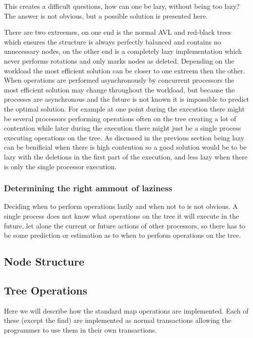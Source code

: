 \documentclass[10pt]{sigplanconf}
\begin{document}
This creates a difficult questions, how can one be lazy, without being too lazy?
The answer is not obvious, but a possible solution is presented here.

There are two extreemes, on one end is the normal AVL and red-black trees which ensures the structure is always perfectly balanced and contains no unnecessary nodes, on the other end is a completely
lazy implementation which never performs rotations and only marks nodes as deleted.
Depending on the workload the most efficient solution can be closer to one extreem then the other.
When operations are performed asynchronously by concurrent processors the most efficient solution may change throughout the workload,
but because the processes are asynchronous and the future is not known it is impossible to predict the optimal solution.
For example at one point during the execution there might be several processors performing operations often on the tree creating a lot of contention
while later during the execution there might just be a single process executing operations on the tree.
As discussed in the previous section being lazy can be benificial when there is high contention so a good solution would be to be lazy with the
deletions in the first part of the execution, and less lazy when there is only the single processor execution.

\subsubsection{Determining the right ammout of laziness}
Deciding when to perform operations lazily and when not to is not obvious.
A single process does not know what operations on the tree it will execute in the future, let alone the current or future actions of other processors,
so there has to be some prediction or estimation as to when to perform operations on the tree.




\subsection{Node Structure}

\subsection{Tree Operations}
Here we will describe how the standard map operations are implemented.
Each of these (except the find) are implemented as normal transactions allowing the programmer to use them in their own transactions.
\end{document}
